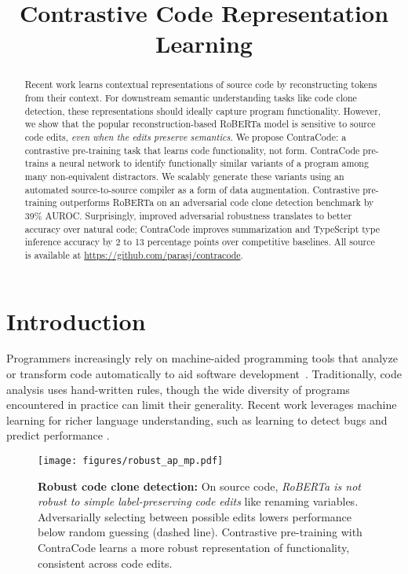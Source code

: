 \documentclass[11pt]{article}
\title{Contrastive Code Representation Learning}
\author{Paras Jain$^*$ \and Ajay Jain$^*$ \and Tianjun Zhang \and\\\textbf{Pieter Abbeel \and Joseph E. Gonzalez \and Ion Stoica} \\
	Department of EECS, UC Berkeley\\
  \texttt{\{parasj, ajayj, tianjunz,}\\\texttt{pabbeel, jegonzal, istoica\}@berkeley.edu}}
\newcommand{\ours}[0]{ContraCode}
\begin{document}
\maketitle
\begin{abstract}
Recent work learns contextual representations of source code by reconstructing tokens from their context. For downstream semantic understanding tasks like code clone detection, these representations should ideally capture program functionality. However, we show that the popular reconstruction-based RoBERTa model is sensitive to source code edits, \textit{even when the edits preserve semantics}. We propose ContraCode: a contrastive pre-training task that learns code functionality, not form. ContraCode pre-trains a neural network to identify functionally similar variants of a program among many non-equivalent distractors. We scalably generate these variants using an automated source-to-source compiler as a form of data augmentation. Contrastive pre-training outperforms RoBERTa on an adversarial code clone detection benchmark by 39\% AUROC. Surprisingly, improved adversarial robustness translates to better accuracy over natural code; ContraCode improves summarization and TypeScript type inference accuracy by 2 to 13 percentage points over competitive baselines. All source is available at \url{https://github.com/parasj/contracode}.
\end{abstract}

\section{Introduction}
Programmers increasingly rely on machine-aided programming tools that analyze or transform code automatically to aid software development~\citep{refactoring_kim2012field}. Traditionally, code analysis uses hand-written rules, though the wide diversity of programs encountered in practice can limit their generality. Recent work leverages machine learning for richer language understanding, such as learning to detect bugs \cite{pradel2018deepbugs} and predict performance \cite{mendis2019ithemal}.

\begin{figure}[t]
    \centering
    \texttt{[image: figures/robust\_ap\_mp.pdf]}
    \caption{\textbf{Robust code clone detection:} On source code, \emph{RoBERTa is not robust to simple label-preserving code edits} like renaming variables. Adversarially selecting between possible edits lowers performance below random guessing (dashed line). Contrastive pre-training with \ours{} learns a more robust representation of functionality, consistent across code edits.}
    \label{fig:bert_motivation_robust}
\end{figure}
\end{document}
